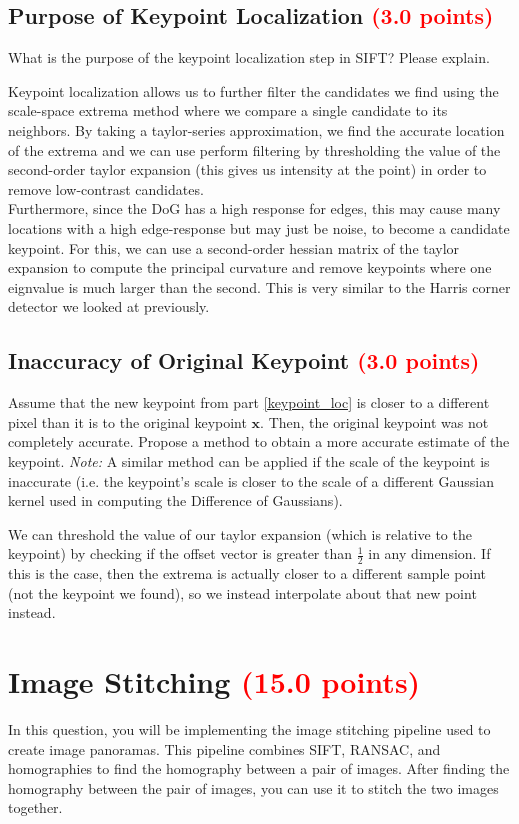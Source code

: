 \documentclass[answers]{exam}
\newcommand{\mypoints}[1]{\textcolor{red}{(#1 points)}}
\begin{document}
\subsection{Purpose of Keypoint Localization \mypoints{3.0}}
What is the purpose of the keypoint localization step in SIFT? Please explain.
\begin{solution}
Keypoint localization allows us to further filter the candidates we find using the scale-space extrema method where we compare a single candidate to its neighbors. By taking a taylor-series approximation, we find the accurate location of the extrema and we can use perform filtering by thresholding the value of the second-order taylor expansion (this gives us intensity at the point) in order to remove low-contrast candidates.\\
Furthermore, since the DoG has a high response for edges, this may cause many locations with a high edge-response but may just be noise, to become a candidate keypoint. For this, we can use a second-order hessian matrix of the taylor expansion to compute the principal curvature and remove keypoints where one eignvalue is much larger than the second. This is very similar to the Harris corner detector we looked at previously.
\end{solution}

\subsection{Inaccuracy of Original Keypoint \mypoints{3.0}}
Assume that the new keypoint from part \ref{keypoint_loc} is closer to a different pixel than it is to the original keypoint $\mathbf{x}$. Then, the original keypoint was not completely accurate. Propose a method to obtain a more accurate estimate of the keypoint. \emph{Note:} A similar method can be applied if the scale of the keypoint is inaccurate (i.e. the keypoint's scale is closer to the scale of a different Gaussian kernel used in computing the Difference of Gaussians).
\begin{solution}
We can threshold the value of our taylor expansion (which is relative to the keypoint) by checking if the offset vector is greater than $\frac{1}{2}$ in any dimension. If this is the case, then the extrema is actually closer to a different sample point (not the keypoint we found), so we instead interpolate about that new point instead.
\end{solution}

\newpage

\section{Image Stitching \mypoints{15.0}}
In this question, you will be implementing the image stitching pipeline used to create image panoramas. This pipeline combines SIFT, RANSAC, and homographies to find the homography between a pair of images. After finding the homography between the pair of images, you can use it to stitch the two images together.
\end{document}
